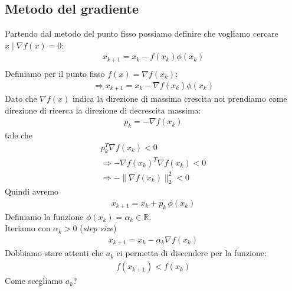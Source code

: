 \documentclass[a4paper,12pt]{article}
\begin{document}
\subsection{Metodo del gradiente}
\label{sec:met_grad}
Partendo dal metodo del punto fisso possiamo definire che vogliamo cercare $x \mid \nabla f(x)=0$:
\begin{align*}
    x_{k+1} = x_k-f(x_k)\phi(x_k) \\
\end{align*}
Definiamo per il punto fisso $f(x) = \nabla f(x_k)$:
\begin{align*}
        \Rightarrow  x_{k+1} = x_k - \nabla f(x_k) \phi(x_k)
\end{align*}
Dato che $\nabla f(x)$ indica la direzione di massima crescita noi prendiamo come direzione di ricerca la direzione di decrescita massima:
\begin{align*}
    p_k = - \nabla f(x_k)
\end{align*}
tale che
\begin{align*}
    p_k^T \nabla f(x_k) < 0 \\
    \Rightarrow - \nabla f(x_k)^T \nabla f(x_k) < 0 \\
    \Rightarrow \boxed{-\| \nabla f(x_k) \|_2^2 < 0}
\end{align*}
Quindi avremo 
\begin{align*}
    x_{k+1} = x_k + p_k \,\phi(x_k)
\end{align*}
Definiamo la funzione $\phi(x_k) = \alpha_k \in \mathbb{R}$. \\
Iteriamo con $\alpha_k > 0$ (\textit{step size})
\begin{align*}
    \boxed{x_{k+1} = x_k - \alpha_k \nabla f(x_k)}
\end{align*}
Dobbiamo stare attenti che $a_k$ ci permetta di discendere per la funzione:
\begin{align*}
    f(x_{k+1}) < f(x_k)
\end{align*}
Come scegliamo $a_k$?
\end{document}
